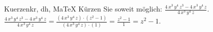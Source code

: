 \begin{MAufgabe}{Kuerzen}{kr, dh, MaTeX}
K\"urzen Sie soweit m\"oglich: $\frac{4\, x^3\, y^4\, z^3 - 4\, x^3\, y^4\, z}{4\, x^3\, y^4\, z}$.\\ 
\ifLsg\MLoesung
\quad $\frac{4\, x^3\, y^4\, z^3 - 4\, x^3\, y^4\, z}{4\, x^3\, y^4\, z}=\frac{(4\, x^3\, y^4\, z)\cdot(z^2 - 1)}{(4\, x^3\, y^4\, z)\cdot(1)}=\frac{z^2 - 1}{1}=z^2 - 1$.\else\relax\fi
 \end{MAufgabe}